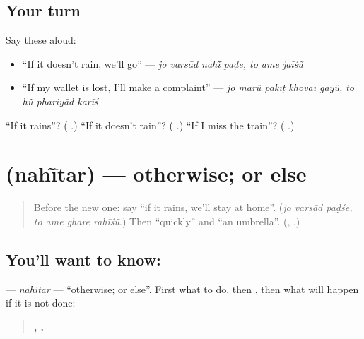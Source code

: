 \subsection*{Your turn}
Say these aloud:

\begin{itemize}
\raggedright
  \item \textquotedblleft{}If it doesn't rain, we'll go\textquotedblright{} — \emph{jo varsād nahī̃ paḍe, to ame jaīśũ}
  \item \textquotedblleft{}If my wallet is lost, I'll make a complaint\textquotedblright{} — \emph{jo mārũ pākīṭ khovāī gayũ, to hũ phariyād karīś}
\end{itemize}

\begin{tcolorbox}[breakable,colback=teal!4,colframe=teal!35!black,title={Before you move on}]
\textquotedblleft{}If it rains\textquotedblright{}? (\textbf{  }.) \textquotedblleft{}If it doesn't rain\textquotedblright{}? (\textbf{   }.) \textquotedblleft{}If I miss the train\textquotedblright{}? (\textbf{   }.)
\end{tcolorbox}
\section[\texorpdfstring{\gu{નહીંતર} (nahī̃tar)}{નહીંતર (nahī̃tar)}]{ (nahī̃tar) — otherwise; or else}

\label{lesson:GU-C283-nahintar}



\begin{quote}
Before the new one: say \textquotedblleft{}if it rains, we'll stay at home\textquotedblright{}. (\emph{jo varsād paḍśe, to ame ghare rahīśũ}.) Then \textquotedblleft{}quickly\textquotedblright{} and \textquotedblleft{}an umbrella\textquotedblright{}. (\textbf{}, \textbf{}.)
\end{quote}

\subsection*{You'll want to know: }
\textbf{} — \emph{nahī̃tar} — \textquotedblleft{}otherwise; or else\textquotedblright{}. First what to do, then \textbf{}, then what will happen if it is not done:

\begin{quote}
\textbf{ ,    .}
\end{quote}

